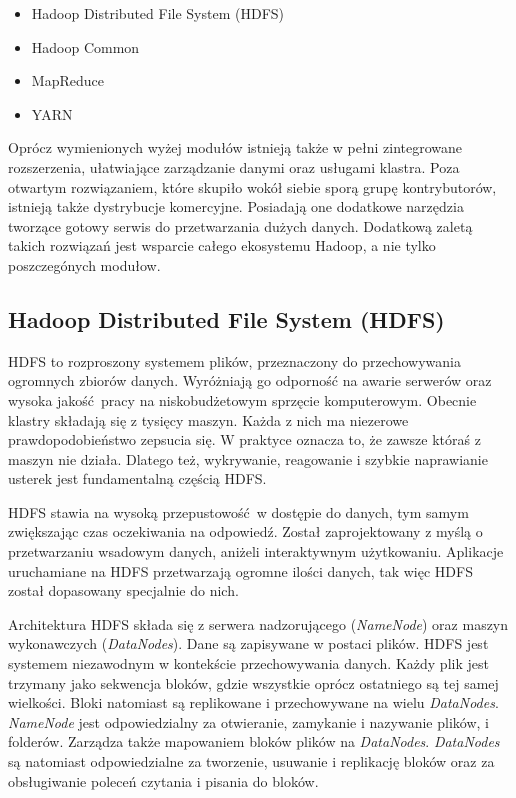 \documentclass[licencjacka]{pracamgr}
\begin{document}
\begin{itemize}
    \item Hadoop Distributed File System (HDFS)
    \item Hadoop Common
    \item MapReduce
    \item YARN
\end{itemize}

Oprócz wymienionych wyżej modułów istnieją także w pełni zintegrowane rozszerzenia, ułatwiające zarządzanie danymi oraz usługami klastra. Poza otwartym rozwiązaniem, które skupiło wokół siebie sporą grupę kontrybutorów, istnieją także dystrybucje komercyjne. Posiadają one dodatkowe narzędzia tworzące gotowy serwis do przetwarzania dużych danych. Dodatkową zaletą takich rozwiązań jest wsparcie całego ekosystemu Hadoop, a nie tylko poszczegónych modułow.

\subsection{Hadoop Distributed File System (HDFS)}

HDFS to rozproszony systemem plików, przeznaczony do przechowywania ogromnych zbiorów danych. Wyróżniają go odporność  na awarie serwerów oraz wysoka jakość pracy na niskobudżetowym sprzęcie komputerowym. Obecnie klastry składają się z tysięcy maszyn. Każda z nich ma niezerowe prawdopodobieństwo zepsucia się. W praktyce oznacza to, że zawsze któraś z maszyn nie działa. Dlatego też, wykrywanie, reagowanie i szybkie naprawianie usterek jest fundamentalną częścią HDFS.

HDFS stawia na wysoką przepustowość w dostępie do danych, tym samym zwiększając czas oczekiwania na odpowiedź. Został zaprojektowany z myślą o przetwarzaniu wsadowym danych, aniżeli interaktywnym użytkowaniu. Aplikacje uruchamiane na HDFS przetwarzają ogromne ilości danych, tak więc HDFS został dopasowany specjalnie do nich.

Architektura HDFS składa się z serwera nadzorującego (\textit{NameNode}) oraz maszyn wykonawczych (\textit{DataNodes}). Dane są zapisywane w postaci plików. HDFS jest systemem niezawodnym w kontekście przechowywania danych. Każdy plik jest trzymany jako sekwencja bloków, gdzie wszystkie oprócz ostatniego są tej samej wielkości. Bloki natomiast są replikowane i przechowywane na wielu \textit{DataNodes}. \textit{NameNode} jest odpowiedzialny za otwieranie, zamykanie i nazywanie plików, i folderów. Zarządza także mapowaniem bloków plików na \textit{DataNodes}. \textit{DataNodes} są natomiast odpowiedzialne za tworzenie, usuwanie i replikację bloków oraz za obsługiwanie poleceń czytania i pisania do bloków.
\end{document}
